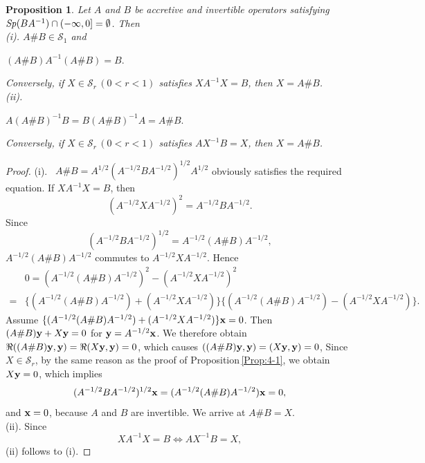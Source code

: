 \documentclass[reqno]{amsart}
\newtheorem{proposition}[theorem]{Proposition}
\theoremstyle{definition}
\theoremstyle{remark}
\begin{document}
\begin{proposition}\label{Prop:5-3} 
Let $A$ and $B$ be accretive and invertible operators satisfying
${\it Sp}(BA^{-1}) \cap (-\infty, 0] = \emptyset$. Then\\
{\rm (i)}. $A\# B \in \mathcal{S}_{1}$ and 
\begin{center} $(A\# B) A^{-1} (A \# B) =B.$\end{center}
Conversely, if  $X \in \mathcal{S}_{r} \,(0<r<1)$  satisfies  $X A^{-1} X = B$,
 then $X = A\# B$.\\
{\rm (ii)}.\begin{center}
$A(A\# B)^{-1} B= B(A\# B)^{-1} A = A\# B.$
\end{center}
Conversely, if  $X \in \mathcal{S}_{r} \,(0<r<1)$  satisfies
 $A X^{-1} B= X$, then $X= A\# B$. 

\end{proposition}
\begin{proof}
(i). \, $A\# B = A^{1/2}(A^{-1/2} B A^{-1/2})^{1/2} A^{1/2}$
 obviously satisfies the 
required equation. If $X A^{-1} X = B$, then 
$$(A^{-1/2} X A^{-1/2})^2 = A^{-1/2} B A^{-1/2}.$$
 Since
$$(A^{-1/2} B A^{-1/2})^{1/2} = A^{-1/2} (A \# B) A^{-1/2},$$
$A^{-1/2} (A \# B) A^{-1/2}$ commutes to 
$A^{-1/2} X A^{-1/2}$. Hence 
\begin{align*}
&0 =(A^{-1/2} (A \# B) A^{-1/2})^2 - (A^{-1/2} X A^{-1/2})^2 \\
=& \{(A^{-1/2} (A \# B) A^{-1/2}) + (A^{-1/2} X A^{-1/2}) \} 
\{(A^{-1/2} (A \# B) A^{-1/2}) - (A^{-1/2} X A^{-1/2})\}.
\end{align*}
Assume $\{(A^{-1/2} (A \# B) A^{-1/2}) + (A^{-1/2} X A^{-1/2})\} {\bf x} =0$. 
Then $ (A \# B) {\bf y} + X {\bf y} = 0$ for ${\bf y}= A^{-1/2} {\bf x}$. 
We therefore obtain $\Re {((A \# B) {\bf y}, {\bf y})} = \Re{ (X {\bf y}, {\bf y})} =0$, 
which causes $((A \# B) {\bf y}, {\bf y}) =  (X {\bf y}, {\bf y}) =0$,
Since $X \in \mathcal{S}_{r}$, 
by the same reason as the proof of Proposition\,\ref{Prop:4-1}, we obtain 
$X {\bf y} =0$, which implies 
$$(A^{-1/2} B A^{-1/2})^{1/2}{\bf x} = (A^{-1/2} (A \# B) A^{-1/2}){\bf x} =0,$$
and ${\bf x}=0$, because $A$ and $B$ are invertible. We arrive at $A\# B = X$.\\
(ii). Since
$$XA^{-1}X=B \Longleftrightarrow A X ^{-1} B= X,$$
(ii) follows to (i). 
\end{proof}
 
\end{document}
